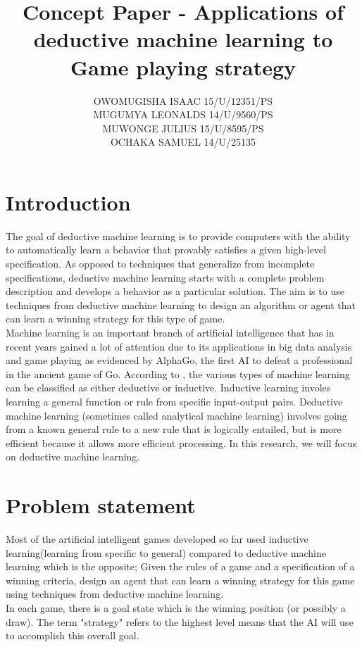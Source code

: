 \documentclass[11pt]{article}
\title{Concept Paper - Applications of deductive machine learning to Game playing strategy}
\author{OWOMUGISHA ISAAC \hspace{1cm}15/U/12351/PS\\ MUGUMYA LEONALDS \hspace{1cm} 14/U/9560/PS\\MUWONGE JULIUS \hspace{1cm} 15/U/8595/PS \\ OCHAKA SAMUEL \hspace{1cm} 14/U/25135}
\date{}
\begin{document}
\maketitle

\section{Introduction}
The goal of deductive machine learning is to provide computers with the ability to automatically learn a behavior that provably satisfies a given high-level specification. As opposed to techniques that generalize from incomplete specifications, deductive machine learning starts with a complete problem description and develops a behavior as a particular solution. The aim is to use techniques from deductive machine learning to design an algorithm or agent that can learn a winning strategy for this type of game.\\

Machine learning is an important branch of artificial intelligence that has in recent years gained a lot of attention due to its applications in big data analysis and game playing as evidenced by AlphaGo, the first AI to defeat a professional in the ancient game of Go.
According to \cite{russell2010artificial}, the various types of machine learning can be classified as either deductive or inductive. Inductive learning involes learning a general function or rule from specific input-output pairs. Deductive machine learning (sometimes called analytical machine learning) involves going from a known general rule to a new rule that is logically entailed, but is more efficient because it allows more efficient processing. In this research, we will focus on deductive machine learning.\\

\section{Problem statement}
Most of the artificial intelligent games developed so far used inductive learning(learning from specific to general) compared to deductive machine learning which is the opposite; Given the rules of a game and a specification of a winning criteria, design an agent that can learn a winning strategy for this game using techniques from deductive machine learning.\\

In each game, there is a goal state which is the winning position (or possibly a draw). The term "strategy" refers to the highest level means that the AI will use to accomplish this overall goal.\\
\end{document}
